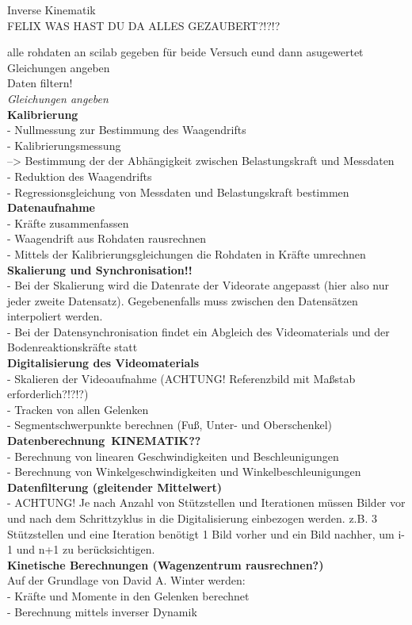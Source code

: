Inverse Kinematik\\
FELIX WAS HAST DU DA ALLES GEZAUBERT?!?!?


alle rohdaten an scilab gegeben für beide Versuch eund dann asugewertet\\
Gleichungen angeben\\
Daten filtern!\\
\textit{Gleichungen angeben}\\
\textbf{Kalibrierung}\\
- Nullmessung zur Bestimmung des Waagendrifts\\
- Kalibrierungsmessung\\
--> Bestimmung der der Abhängigkeit zwischen Belastungskraft und Messdaten\\
- Reduktion des Waagendrifts\\
- Regressionsgleichung von Messdaten und Belastungskraft bestimmen\\
\textbf{Datenaufnahme}\\
- Kräfte zusammenfassen\\
- Waagendrift aus Rohdaten rausrechnen\\
- Mittels der Kalibrierungsgleichungen die Rohdaten in Kräfte umrechnen\\
\textbf{Skalierung und Synchronisation!!}\\
- Bei der Skalierung wird die Datenrate der Videorate angepasst (hier also nur jeder zweite Datensatz). Gegebenenfalls muss zwischen den Datensätzen interpoliert werden.\\
- Bei der Datensynchronisation findet ein Abgleich des Videomaterials und der Bodenreaktionskräfte statt\\
\textbf{Digitalisierung des Videomaterials}\\
- Skalieren der Videoaufnahme (ACHTUNG! Referenzbild mit Maßstab erforderlich?!?!?)\\
- Tracken von allen Gelenken\\
- Segmentschwerpunkte berechnen (Fuß, Unter- und Oberschenkel)\\
\textbf{Datenberechnung\ KINEMATIK??}\\
- Berechnung von linearen Geschwindigkeiten und Beschleunigungen\\
- Berechnung von Winkelgeschwindigkeiten und Winkelbeschleunigungen\\
\textbf{Datenfilterung (gleitender Mittelwert)}\\
- ACHTUNG! Je nach Anzahl von Stützstellen und Iterationen müssen Bilder vor und nach dem Schrittzyklus in die Digitalisierung einbezogen werden. z.B. 3 Stützstellen und eine Iteration benötigt 1 Bild vorher und ein Bild nachher, um i-1 und n+1 zu berücksichtigen.\\
\textbf{Kinetische Berechnungen (Wagenzentrum rausrechnen?)}\\
Auf der Grundlage von David A. Winter werden:\\
- Kräfte und Momente in den Gelenken berechnet\\
- Berechnung mittels inverser Dynamik\\